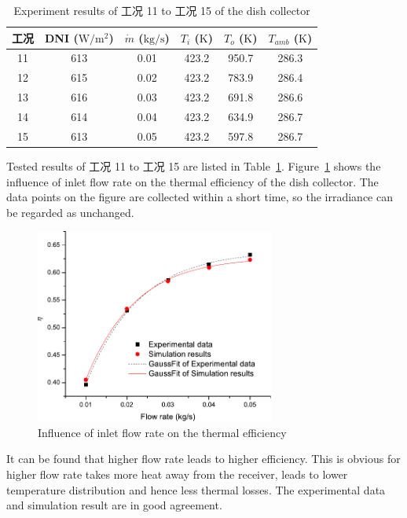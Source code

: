 \begin{table}[htbp]\footnotesize
	\caption{Experiment results of 工况 11 to 工况 15 of the dish collector}
	\begin{center}
	\begin{tabular}{cccccc}
		\toprule
		工况	& DNI ($\mathrm{W/m^2}$)	&	$\dot{m}$ ($\mathrm{kg/s}$)			&	$T_i$ ($\mathrm{K}$)	&	$T_o$ ($\mathrm{K}$)		&	$T_{amb}$ ($\mathrm{K}$)\\
		\midrule
		11	&	613	&	0.01	&	423.2	&	950.7	&	286.3\\
		12	&	615	&	0.02	&	423.2	&	783.9	&	286.4\\
		13	&	616	&	0.03	&	423.2	&	691.8	&	286.6	\\
		14	&	614	&	0.04	&	423.2	&	634.9	&	286.7\\
		15	&	613	&	0.05	&	423.2	&	597.8	&	286.7\\
		\bottomrule
	\end{tabular}
	\end{center}
	\label{tab:ResultOfDish2}
\end{table}
Tested results of 工况 11 to 工况 15 are listed in Table~\ref{tab:ResultOfDish2}.
Figure~\ref{fig:q_m-eta-dish} shows the influence of inlet flow rate on the thermal efficiency of the dish collector. The data points on the figure are collected within a short time, so the irradiance can be regarded as unchanged.
\begin{figure}[!ht]
\centering
\includegraphics[width=0.7\textwidth]{fig/q_m-eta-dish}
\caption{Influence of inlet flow rate on the thermal efficiency}
\label{fig:q_m-eta-dish}
\end{figure}

It can be found that higher flow rate leads to higher efficiency. This is obvious for higher flow rate takes more heat away from the receiver, leads to lower temperature distribution and hence less thermal losses. The experimental data and simulation result are in good agreement.

